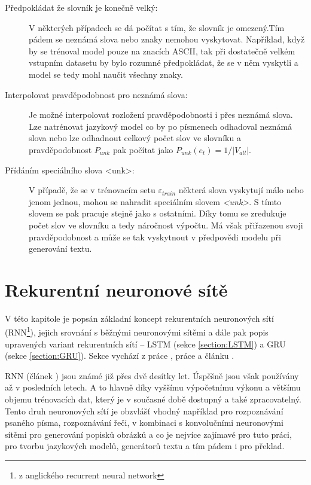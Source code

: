 \begin{description}
  \item[Předpokládat že slovník je konečně velký:] V některých případech se dá počítat s tím, že slovník je omezený.Tím pádem se neznámá slova nebo znaky nemohou vyskytovat. Například, když by se trénoval model pouze na znacích ASCII, tak při dostatečně velkém vstupním datasetu by bylo rozumné předpokládat, že se v něm vyskytli a model se tedy mohl naučit všechny znaky.
  \item[Interpolovat pravděpodobnost pro neznámá slova:] Je možné interpolovat rozložení pravděpodobnosti i přes neznámá slova. Lze natrénovat jazykový model co by po písmenech odhadoval neznámá slova nebo lze odhadnout celkový počet slov ve slovníku a pravděpodobnost $P_{unk}$ pak počítat jako $P_{unk}(e_t) = 1/|V_{all}|$.
  \item[Přídáním speciálního slova <unk>:]\label{description:unk}V případě, že se v trénovacím setu $\varepsilon_{train}$ některá slova vyskytují málo nebo jenom jednou, mohou se nahradit speciálním slovem \emph{<unk>}. S tímto slovem se pak pracuje stejně jako s ostatními. Díky tomu se zredukuje počet slov ve slovníku a tedy náročnost výpočtu. Má však přiřazenou svoji pravděpodobnost a může se tak vyskytnout v předpovědi modelu při generování textu. 
\end{description}

\section{Rekurentní neuronové sítě}\label{section:rnn}
V této kapitole je popsán základní koncept rekurentních neuronových sítí (RNN\footnote{z anglického recurrent neural network}), jejich srovnání s běžnými neuronovými sítěmi a dále pak popis upravených variant rekurentních sítí -- LSTM (sekce \ref{section:LSTM}) a GRU (sekce \ref{section:GRU}). Sekce vychází z práce \cite{nmtThesis}, práce \cite{nmtTutorial} a článku \cite{understandingLSTM}.


RNN (článek \cite{rnn}) jsou známé již přes dvě desítky let. Úspěšně jsou však používány až v posledních letech. A to hlavně díky vyššímu výpočetnímu výkonu a většímu objemu trénovacích dat, který je v současné době dostupný a také zpracovatelný. Tento druh neuronových sítí je obzvlášť vhodný například pro rozpoznávání psaného písma, rozpoznávání řeči, v kombinaci s konvolučními neuronovými sítěmi pro generování popisků obrázků a co je nejvíce zajímavé pro tuto práci, pro tvorbu jazykových modelů, generátorů textu a tím pádem i pro překlad.

